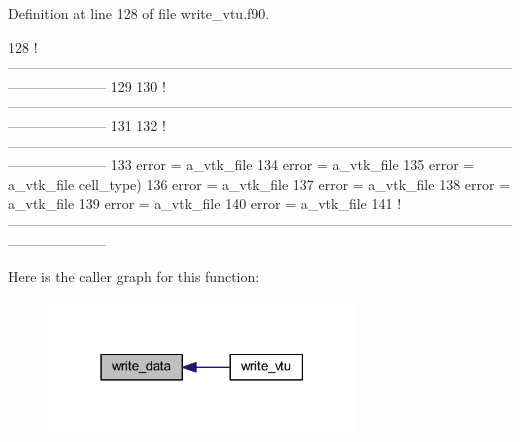 Definition at line 128 of file write\+\_\+vtu.\+f90.


\begin{DoxyCode}
128   \textcolor{comment}{
      !---------------------------------------------------------------------------------------------------------------------------------}
129   
130   \textcolor{comment}{
      !---------------------------------------------------------------------------------------------------------------------------------}
131 
132   \textcolor{comment}{
      !---------------------------------------------------------------------------------------------------------------------------------}
133   error = a\_vtk\_file%
134   error = a\_vtk\_file%
135   error = a\_vtk\_file%
      cell\_type)
136   error = a\_vtk\_file%
137   error = a\_vtk\_file%
138   error = a\_vtk\_file%
139   error = a\_vtk\_file%
140   error = a\_vtk\_file%
141   \textcolor{comment}{
      !---------------------------------------------------------------------------------------------------------------------------------}
\end{DoxyCode}
Here is the caller graph for this function\+:\nopagebreak
\begin{figure}[H]
\begin{center}
\leavevmode
\includegraphics[width=231pt]{write__vtu_8f90_ad3d26430620662abc6caea56402b8c72_icgraph}
\end{center}
\end{figure}
\mbox{\label{write__vtu_8f90_ae39ce165900c97fc318d09bf9670ac92}} 
